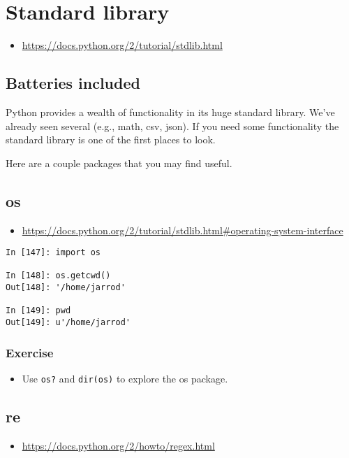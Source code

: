 \section{Standard library}
\begin{itemize}
\item \url{https://docs.python.org/2/tutorial/stdlib.html}
\end{itemize}

\subsection{Batteries included}
Python provides a wealth of functionality in its huge standard library.
We've already seen several (e.g., math, csv, json). If you need some functionality
the standard library is one of the first places to look.

Here are a couple packages that you may find useful.

\subsection{os}
\begin{itemize}
\item \url{https://docs.python.org/2/tutorial/stdlib.html#operating-system-interface}
\end{itemize}

\begin{verbatim}
In [147]: import os

In [148]: os.getcwd()
Out[148]: '/home/jarrod'

In [149]: pwd
Out[149]: u'/home/jarrod'
\end{verbatim}

\subsubsection{Exercise}
\begin{itemize}
\item Use \texttt{os?} and \texttt{dir(os)} to explore the os package.
\end{itemize}

\subsection{re}
\begin{itemize}
\item \url{https://docs.python.org/2/howto/regex.html}
\end{itemize}


